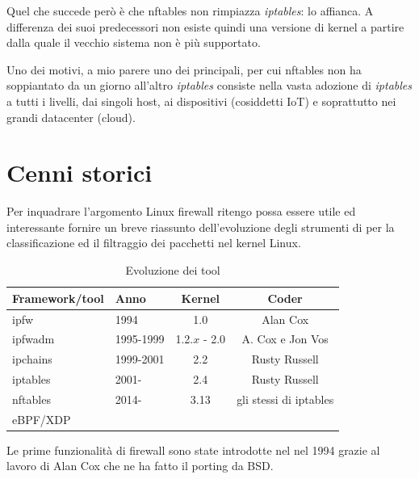 Quel che succede però è che nftables non rimpiazza {\em iptables}: lo affianca.  A
differenza dei suoi predecessori non esiste quindi una versione di kernel a
partire dalla quale il vecchio sistema non è più supportato.

Uno dei motivi, a mio parere uno dei principali, per cui nftables non ha
soppiantato da un giorno all'altro {\em iptables} consiste nella vasta adozione di
{\em iptables} a tutti i livelli, dai singoli host, ai dispositivi (cosiddetti IoT) e
soprattutto nei grandi datacenter (cloud).

\chapter{Cenni storici}

\label{Cenni storici} %

Per inquadrare l'argomento Linux firewall ritengo possa essere utile ed
interessante fornire un breve riassunto dell'evoluzione degli strumenti di
per la classificazione ed il filtraggio dei pacchetti nel kernel Linux.

\begin{center}
  \begin{table}[ht]
    \caption{Evoluzione dei tool} %
    \centering %
      \begin{tabular}{@{}llcc@{}}
	\toprule
	{\bf Framework/tool}  &         {\bf Anno}      &  {\bf Kernel} & {\bf Coder}\\ \midrule
	ipfw  &         1994      &  1.0 & Alan Cox \\
	ipfwadm  &      1995-1999 &  1.2.$x$\marginnote{con $x>0$} - 2.0 & A.  Cox e Jon Vos\\ [0.5ex]
	ipchains &      1999-2001 &  2.2 & Rusty Russell \\ [0.5ex]
	iptables &      2001-     &  2.4 & Rusty Russell \\ [0.5ex]
	nftables &      2014-     &  3.13 & gli stessi di iptables \\ [0.5ex]
	eBPF/XDP &     &  \\ \bottomrule
     \end{tabular}  
  \end{table}
\end{center}

Le prime funzionalità di firewall sono state introdotte nel nel 1994 grazie al
lavoro di Alan Cox che ne ha fatto il porting da BSD.

